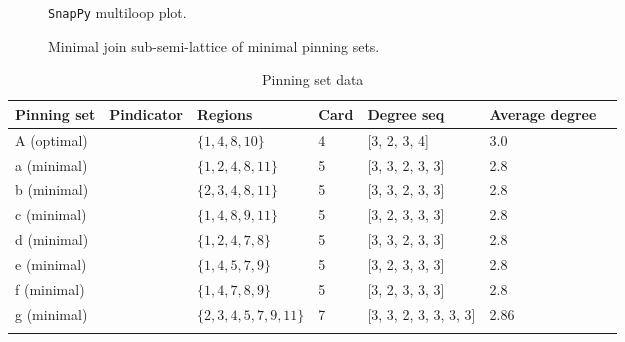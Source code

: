 \documentclass{article}%
\begin{document}
\begin{multicols}{2}
\begin{figure}[H]
\centering

\caption{\texttt{SnapPy} multiloop plot.}
\label{fig:tex/img/[[1, 5, 20, 6], [1, 14, 2, 15], [5, 11, 4, 12], [20, 12, 19, 13], [6, 13, 7, 14], [2, 9, 3, 10], [15, 10, 16, 11], [4, 16, 3, 17], [19, 8, 18, 7], [9, 18, 8, 17]].svg}
\end{figure}
\columnbreak

\begin{figure}[H]
\centering
\scalebox{0.8}{}
\caption{Minimal join sub-semi-lattice of minimal pinning sets.}
\label{fig:tex/img/[[1, 5, 20, 6], [1, 14, 2, 15], [5, 11, 4, 12], [20, 12, 19, 13], [6, 13, 7, 14], [2, 9, 3, 10], [15, 10, 16, 11], [4, 16, 3, 17], [19, 8, 18, 7], [9, 18, 8, 17]].pgf}
\end{figure}
\end{multicols}

\newpage

\begin{table}[ht]
	\caption{Pinning set data}
	\centering
	\renewcommand{\arraystretch}{1.5}
	\begin{tabularx}{\textwidth}{lXXXXXX}
		\toprule
			Pinning set & Pindicator & Regions & Card & Degree seq & Average degree\\
			\hline
			A (optimal) & {\Huge\textcolor{red0}{\textbullet}} & $\{1,4,8,10\}$ & 4 & [3, 2, 3, 4] & 3.0 \\
			a (minimal) & {\Huge\textcolor{green0}{\textbullet}} & $\{1,2,4,8,11\}$ & 5 & [3, 3, 2, 3, 3] & 2.8 \\
			b (minimal) & {\Huge\textcolor{green10}{\textbullet}} & $\{2,3,4,8,11\}$ & 5 & [3, 3, 2, 3, 3] & 2.8 \\
			c (minimal) & {\Huge\textcolor{green21}{\textbullet}} & $\{1,4,8,9,11\}$ & 5 & [3, 2, 3, 3, 3] & 2.8 \\
			d (minimal) & {\Huge\textcolor{green32}{\textbullet}} & $\{1,2,4,7,8\}$ & 5 & [3, 3, 2, 3, 3] & 2.8 \\
			e (minimal) & {\Huge\textcolor{green42}{\textbullet}} & $\{1,4,5,7,9\}$ & 5 & [3, 2, 3, 3, 3] & 2.8 \\
			f (minimal) & {\Huge\textcolor{green53}{\textbullet}} & $\{1,4,7,8,9\}$ & 5 & [3, 2, 3, 3, 3] & 2.8 \\
			g (minimal) & {\Huge\textcolor{green64}{\textbullet}} & $\{2,3,4,5,7,9,11\}$ & 7 & [3, 3, 2, 3, 3, 3, 3] & 2.86 \\
		\bottomrule \\ 
	\end{tabularx}
\end{table}
\end{document}
